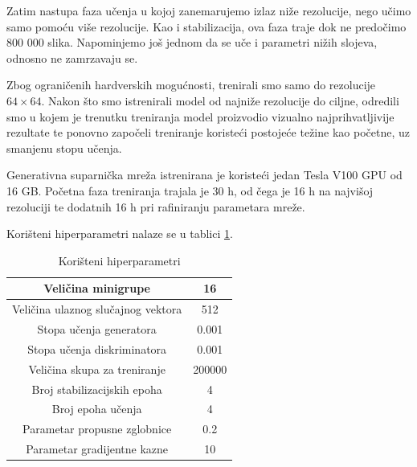 Zatim nastupa faza učenja u kojoj zanemarujemo izlaz niže rezolucije, nego učimo samo pomoću više rezolucije. Kao i stabilizacija, ova faza traje dok ne predočimo 800 000 slika. Napominjemo još jednom da se uče i parametri nižih slojeva, odnosno ne zamrzavaju se.

Zbog ograničenih hardverskih mogućnosti, trenirali smo samo do rezolucije $64 \times 64$. Nakon što smo istrenirali model od najniže rezolucije do ciljne, odredili smo u kojem je trenutku treniranja model proizvodio vizualno najprihvatljivije rezultate te ponovno započeli treniranje koristeći postojeće težine kao početne, uz smanjenu stopu učenja. 

Generativna suparnička mreža istrenirana je koristeći jedan Tesla V100 GPU od 16 GB. Početna faza treniranja trajala je 30 h, od čega je 16 h na najvišoj rezoluciji te dodatnih 16 h pri rafiniranju parametara mreže. 

Korišteni hiperparametri nalaze se u tablici \ref{tablica_hiper}.

\begin{table}[h]
\caption{Korišteni hiperparametri}
\begin{center}
\begin{tabular}{|c|c|} 
 \hline
 Veličina minigrupe & 16\\ 
 \hline
 Veličina ulaznog slučajnog vektora & 512\\
 \hline
 Stopa učenja generatora & 0.001\\ 
 \hline
 Stopa učenja diskriminatora & 0.001\\ 
 \hline
 Veličina skupa za treniranje & 200000\\
 \hline
 Broj stabilizacijskih epoha & 4\\
 \hline
 Broj epoha učenja & 4\\
 \hline
 Parametar propusne zglobnice & 0.2\\
 \hline
 Parametar gradijentne kazne & 10\\
 \hline
\end{tabular}
\end{center}
\label{tablica_hiper}
\end{table}
